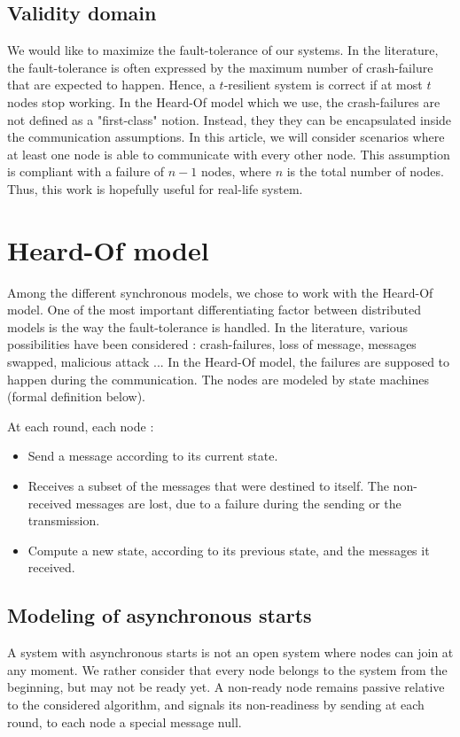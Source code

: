 \documentclass{article}
\begin{document}
\subsection{Validity domain}

We would like to maximize the fault-tolerance of our systems.
In the literature, the fault-tolerance is often expressed by the maximum number of crash-failure that are expected to happen.
Hence, a $t$-resilient system is correct if at most $t$ nodes stop working.
In the Heard-Of model which we use, the crash-failures are not defined as a "first-class" notion.
Instead, they they can be encapsulated inside the communication assumptions.
In this article, we will consider scenarios where at least one node is able to communicate with every other node.
This assumption is compliant with a failure of $n-1$ nodes, where $n$ is the total number of nodes.
Thus, this work is hopefully useful for real-life system.

\section{Heard-Of model}

Among the different synchronous models, we chose to work with the Heard-Of model.
One of the most important differentiating factor between distributed models is the way the fault-tolerance is handled.
In the literature, various possibilities have been considered : crash-failures, loss of message, messages swapped, malicious attack ...
In the Heard-Of model, the failures are supposed to happen during the communication.
The nodes are modeled by state machines (formal definition below).

At each round, each node :
\begin{itemize}
	\item Send a message according to its current state.
	\item Receives a subset of the messages that were destined to itself. The non-received messages are lost, due to a failure during the sending or the transmission.
	\item Compute a new state, according to its previous state, and the messages it received.
\end{itemize}

\subsection{Modeling of asynchronous starts}

A system with asynchronous starts is not an open system where nodes can join at any moment.
We rather consider that every node belongs to the system from the beginning, but may not be ready yet.
A non-ready node remains passive relative to the considered algorithm, and signals its non-readiness by sending at each round, to each node a special message null.
\end{document}
